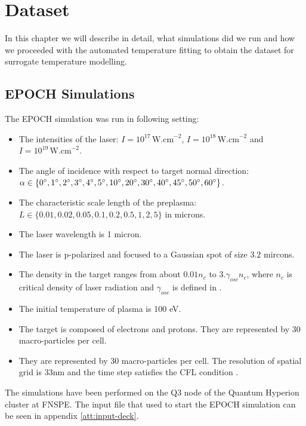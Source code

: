 \chapter{Dataset}
In this chapter we will describe in detail, what simulations did we run and how we proceeded with the automated temperature fitting to obtain the dataset for surrogate temperature modelling.
\section{EPOCH Simulations}
The EPOCH simulation was run in following setting:
\begin{itemize}
	\item The intensities of the laser: $I=10^{17}\,\mathrm{W.cm}^{-2}$, $I=10^{18} \,\mathrm{W.cm}^{-2}$ and \newline$I=10^{19}\,\mathrm{W.cm}^{-2}$.
	\item The angle of incidence with respect to target normal direction: \newline $\alpha \in \{0\degree,1\degree,2\degree,3\degree,4\degree,5\degree,10\degree,20\degree,30\degree,40\degree,45\degree,50\degree,60\degree\}$.
	\item The characteristic scale length of the preplasma: \newline $L\in\{0.01,0.02,0.05,0.1,0.2,0.5,1,2,5\}$ in microns.
	\item The laser wavelength is 1 micron.
	\item The laser is p-polarized and focused to a Gaussian spot of size $3.2$ mircons.
	\item The density in the target ranges from about $0.01n_c$ to $3.\gamma_{osc}n_c$, where $n_c$ is critical density of laser radiation \cite{cui2013} and $\gamma_{osc}$ is defined in \cite{cui2013}.
	\item The initial temperature of plasma is 100 eV.
	\item The target is composed of electrons and protons. They are represented by 30 macro-particles per cell.
	\item They are represented by 30 macro-particles per cell. The resolution of spatial grid is 33nm and the time step satisfies the CFL condition \cite{arber2015}.
	
\end{itemize}
The simulations have been performed on the Q3 node of the Quantum Hyperion cluster at FNSPE. The input file that used to start the EPOCH simulation can be seen in appendix \ref{att:input-deck}.

